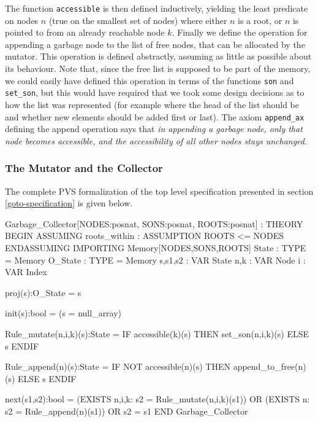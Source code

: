 The function {\tt accessible}  is then defined inductively,
yielding the least predicate on nodes $n$ (true on the smallest set of
nodes) where either  $n$ is  a root, or    $n$ is pointed to from   an
already  reachable node $k$.    Finally  we define  the  operation for
appending a garbage   node to the list    of free nodes,  that  can be
allocated by the    mutator.  This operation is   defined  abstractly,
assuming as little as possible  about its behaviour. Note that,  since
the  free list is supposed to  be part of the  memory, we could easily
have  defined this operation  in terms of the  functions {\tt son} and
{\tt set\_son}, but this would have  required that we took some design
decisions as to how  the list was  represented (for example where  the
head of the  list should be and whether  new elements  should be added
first  or last)\@.   The axiom {\tt   append\_ax} defining the  append
operation says  that {\em in appending a  garbage node, only that node
  becomes accessible,  and the accessibility of  all other nodes stays
  unchanged}\@.

\subsubsection{The Mutator and the Collector}

The  complete PVS formalization  of  the top  level
specification  presented in section  \ref{goto-specification} is given
below.

\begin{smallsession}
Garbage_Collector[NODES:posnat, SONS:posnat, ROOTS:posnat] : THEORY
BEGIN
  ASSUMING roots_within : ASSUMPTION ROOTS <= NODES ENDASSUMING
  IMPORTING Memory[NODES,SONS,ROOTS]
  State   : TYPE = Memory
  O_State : TYPE = Memory
  s,s1,s2 : VAR State
  n,k     : VAR Node
  i       : VAR Index

  proj(s):O_State = s

  init(s):bool = (s = null_array)

  Rule_mutate(n,i,k)(s):State =
    IF accessible(k)(s) THEN 
      set_son(n,i,k)(s)
    ELSE s ENDIF

  Rule_append(n)(s):State =
    IF NOT accessible(n)(s) THEN
      append_to_free(n)(s)
    ELSE s ENDIF

  next(s1,s2):bool =
    (EXISTS n,i,k: s2 = Rule_mutate(n,i,k)(s1)) OR
    (EXISTS n: s2 = Rule_append(n)(s1)) OR
    s2 = s1
END Garbage_Collector
\end{smallsession}
\label{pvs-specification}

